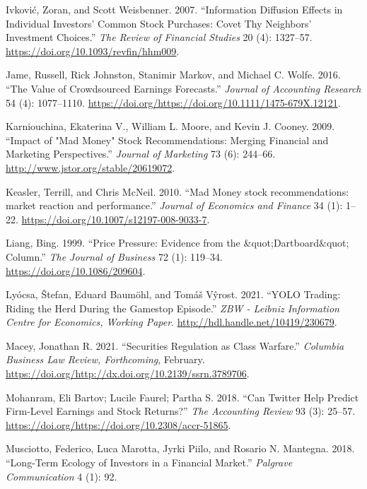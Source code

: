 \documentclass[12pt,]{article}
\begin{document}
\leavevmode\hypertarget{ref-ivkovic2007}{}%
Ivković, Zoran, and Scott Weisbenner. 2007. ``Information Diffusion
Effects in Individual Investors' Common Stock Purchases: Covet Thy
Neighbors' Investment Choices.'' \emph{The Review of Financial Studies}
20 (4): 1327--57. \url{https://doi.org/10.1093/revfin/hhm009}.

\leavevmode\hypertarget{ref-jame2016}{}%
Jame, Russell, Rick Johnston, Stanimir Markov, and Michael C. Wolfe.
2016. ``The Value of Crowdsourced Earnings Forecasts.'' \emph{Journal of
Accounting Research} 54 (4): 1077--1110.
\url{https://doi.org/https://doi.org/10.1111/1475-679X.12121}.

\leavevmode\hypertarget{ref-karniouchina2009}{}%
Karniouchina, Ekaterina V., William L. Moore, and Kevin J. Cooney. 2009.
``Impact of "Mad Money" Stock Recommendations: Merging Financial and
Marketing Perspectives.'' \emph{Journal of Marketing} 73 (6): 244--66.
\url{http://www.jstor.org/stable/20619072}.

\leavevmode\hypertarget{ref-keasler2010}{}%
Keasler, Terrill, and Chris McNeil. 2010. ``Mad Money stock
recommendations: market reaction and performance.'' \emph{Journal of
Economics and Finance} 34 (1): 1--22.
\url{https://doi.org/10.1007/s12197-008-9033-7}.

\leavevmode\hypertarget{ref-liang1999}{}%
Liang, Bing. 1999. ``Price Pressure: Evidence from the
\&quot;Dartboard\&quot; Column.'' \emph{The Journal of Business} 72 (1):
119--34. \url{https://doi.org/10.1086/209604}.

\leavevmode\hypertarget{ref-lyocsa2021}{}%
Lyócsa, Štefan, Eduard Baumöhl, and Tomáš Vŷrost. 2021. ``YOLO Trading:
Riding the Herd During the Gamestop Episode.'' \emph{ZBW - Leibniz
Information Centre for Economics, Working Paper}.
\url{http://hdl.handle.net/10419/230679}.

\leavevmode\hypertarget{ref-macey2021}{}%
Macey, Jonathan R. 2021. ``Securities Regulation as Class Warfare.''
\emph{Columbia Business Law Review, Forthcoming}, February.
\url{https://doi.org/http://dx.doi.org/10.2139/ssrn.3789706}.

\leavevmode\hypertarget{ref-bartov2018}{}%
Mohanram, Eli Bartov; Lucile Faurel; Partha S. 2018. ``Can Twitter Help
Predict Firm-Level Earnings and Stock Returns?'' \emph{The Accounting
Review} 93 (3): 25--57.
\url{https://doi.org/https://doi.org/10.2308/accr-51865}.

\leavevmode\hypertarget{ref-musciotto2018}{}%
Musciotto, Federico, Luca Marotta, Jyrki Piilo, and Rosario N. Mantegna.
2018. ``Long-Term Ecology of Investors in a Financial Market.''
\emph{Palgrave Communication} 4 (1): 92.
\end{document}
